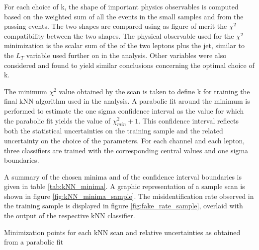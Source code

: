 For each choice of k, the shape of important physics observables is computed based on the weighted sum of all the events in the small samples and from the passing events. The two shapes are compared using as figure of merit the $\chi^2$ compatibility between the two shapes. The physical observable used for the $\chi^2$ minimization is the scalar sum of the \pT of the two leptons plus the jet, similar to the $L_T$ variable used further on in the analysis. Other variables were also considered and found to yield similar conclusions concerning the optimal choice of k.%

The minimum $\chi^2$ value obtained by the scan is taken to define k for training the final kNN algorithm used in the analysis.%
A parabolic fit around the minimum is performed to estimate the one sigma confidence interval as the value for which the parabolic fit yields the value of $\chi^2_{min} + 1$. %
This confidence interval reflects both the statistical uncertainties on the training sample and the related uncertainty on the choice of the parameters. For each channel and each lepton, three classifiers are trained with the corresponding central values and one sigma boundaries.

A summary of the chosen minima and of the confidence interval boundaries is given in table \ref{tab:kNN_minima}. A graphic representation of a sample scan is shown in figure \ref{fig:kNN_minima_sample}. The misidentification rate observed in the training sample is displayed in figure \ref{fig:fake_rate_sample}, overlaid with the output of the respective kNN classifier.


\begin{table}

\caption{Minimization points for each kNN scan and relative uncertainties as obtained from a parabolic fit}

\label{tab:kNN_minima}
\end{table}

